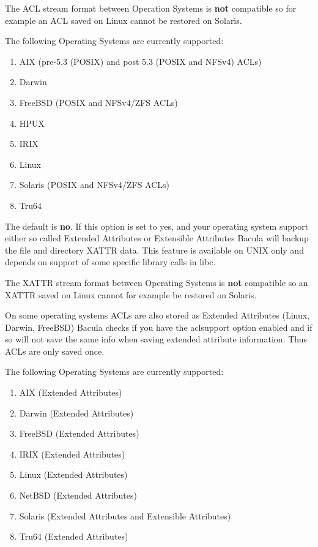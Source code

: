\begin{description}
   The ACL stream format between Operation Systems is \textbf{not}
   compatible so for example an ACL saved on Linux cannot be restored on
   Solaris.

   The following Operating Systems are currently supported:

   \begin{enumerate}
   \item AIX (pre-5.3 (POSIX) and post 5.3 (POSIX and NFSv4) ACLs)
   \item Darwin
   \item FreeBSD (POSIX and NFSv4/ZFS ACLs)
   \item HPUX
   \item IRIX
   \item Linux
   \item Solaris (POSIX and NFSv4/ZFS ACLs)
   \item Tru64
   \end{enumerate}

\label{XattrSupport}
\item [xattrsupport=yes\vb{}no]
   The default is {\bf no}.  If this option is set to yes, and your
   operating system support either so called Extended Attributes or
   Extensible Attributes Bacula will backup the file and directory
   XATTR data. This feature is available on UNIX only and depends on
   support of some specific library calls in libc.

   The XATTR stream format between Operating Systems is {\bf not}
   compatible so an XATTR saved on Linux cannot for example be restored
   on Solaris.

   On some operating systems ACLs are also stored as Extended Attributes
   (Linux, Darwin, FreeBSD) Bacula checks if you have the aclsupport
   option enabled and if so will not save the same info when saving
   extended attribute information. Thus ACLs are only saved once.

   The following Operating Systems are currently supported:

   \begin{enumerate}
   \item AIX (Extended Attributes)
   \item Darwin (Extended Attributes)
   \item FreeBSD (Extended Attributes)
   \item IRIX (Extended Attributes)
   \item Linux (Extended Attributes)
   \item NetBSD (Extended Attributes)
   \item Solaris (Extended Attributes and Extensible Attributes)
   \item Tru64 (Extended Attributes)
   \end{enumerate}


\end{description}
